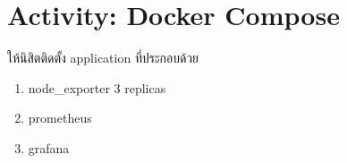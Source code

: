 \documentclass[a4paper, 10pt]{article}
\begin{document}
\subject
{}

\section*{Activity: Docker Compose}

\par\noindent \textthai{ให้นิสิตติดตั้ง} application \textthai{ที่ประกอบด้วย}
\begin{enumerate}
	\item node\_exporter 3 replicas
	\item prometheus
	\item grafana
\end{enumerate}
\end{document}
